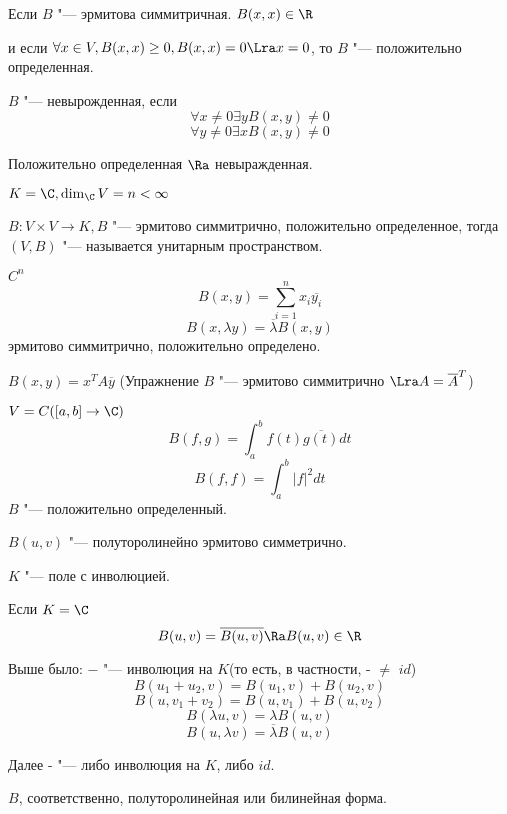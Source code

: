 \begin{Def}
Если $B$ "--- эрмитова симмитричная.
$B(x, x) \in \R$

и если $\forall x \in V, B(x, x) \ge 0, B(x, x) = 0 \Lra x = 0$, то $B$ "--- 
положительно определенная. 
\end{Def}



\begin{Def}
$B$ "--- невырожденная, если 
$$\forall x \ne 0 \exists y B(x, y) \ne 0$$
$$\forall y \ne 0 \exists x B(x, y) \ne 0$$
\end{Def}

Положительно определенная $\Ra$ невыражденная.
\begin{Def}
$K = \C, \dim_{\C}V = n < \infty$

$B \colon V \times V \to K, B$ "--- эрмитово симмитрично, положительно определенное,
тогда $(V, B)$ "--- называется унитарным пространством. 
\end{Def}

\begin{exmp}
\item $C^n$
 $$B(x, y) = \sum_{i = 1}^{n}x_i\overline{y_i}$$
 $$B(x, \lambda y) = \overline{\lambda}B(x, y)$$
 эрмитово симмитрично, положительно определено.
\item $B(x, y) = x^{T}A\overline{y}$
(Упражнение $B$ "--- эрмитово  симмитрично $\Lra A  = \overline{A}^{T}$)
\item $V = C([a, b] \to \C)$
$$B(f, g) = \int_{a}^{b}f(t)\overline{g(t)}dt$$  
$$B(f, f) = \int_{a}^{b}|f|^2dt$$
$B$ "--- положительно определенный. 
\end{exmp}

$B(u, v)$ "--- полуторолинейно эрмитово симметрично.

$K$ "--- поле с инволюцией.

Если $K = \C$
$$B(u, v) = \overline{B(u, v)} \Ra B(u, v) \in \R$$ 

Выше было: $-$ "--- инволюция на $K$(то есть, в частности, - $\ne$ $id$)
$$B(u_1 + u_2, v) = B(u_1, v) + B(u_2, v)$$
$$B(u, v_1 + v_2) = B(u, v_1) + B(u, v_2)$$
$$B(\lambda u, v) = \lambda B(u, v)$$
$$B(u, \lambda v) = \overline{\lambda} B(u, v)$$

Далее - "--- либо инволюция на $K$, либо $id$.

$B$, соответственно, полуторолинейная или билинейная форма.